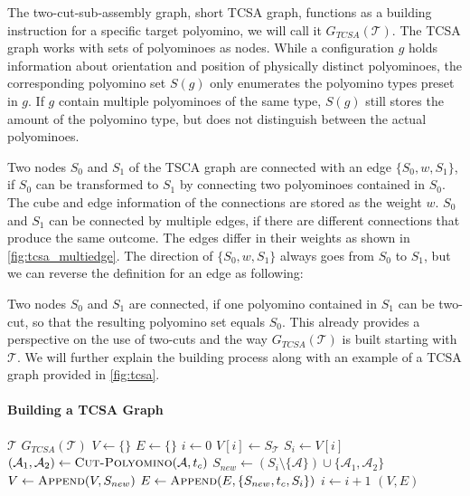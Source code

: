 The two-cut-sub-assembly graph, short TCSA graph, functions as a building instruction for a specific target polyomino, we will call it $G_{\textit{TCSA}}(\mathcal{T})$.
The TCSA graph works with sets of polyominoes as nodes.
While a configuration $g$ holds information about orientation and position of physically distinct polyominoes, the corresponding polyomino set $S(g)$ only enumerates the polyomino types preset in $g$.
If $g$ contain multiple polyominoes of the same type, $S(g)$ still stores the amount of the polyomino type, but does not distinguish between the actual polyominoes.

Two nodes $S_0$ and $S_1$ of the TSCA graph are connected with an edge $\{S_0,w,S_1\}$, if $S_0$ can be transformed to $S_1$ by connecting two polyominoes contained in $S_0$.
The cube and edge information of the connections are stored as the weight $w$.
$S_0$ and $S_1$ can be connected by multiple edges, if there are different connections that produce the same outcome.
The edges differ in their weights as shown in \autoref{fig:tcsa_multiedge}.
The direction of $\{S_0,w,S_1\}$ always goes from $S_0$ to $S_1$, but we can reverse the definition for an edge as following:

Two nodes $S_0$ and $S_1$ are connected, if one polyomino contained in $S_1$ can be two-cut, so that the resulting polyomino set equals $S_0$.
This already provides a perspective on the use of two-cuts and the way $G_{\textit{TCSA}}(\mathcal{T})$ is built starting with $\mathcal{T}$.
We will further explain the building process along with an example of a TCSA graph provided in \autoref{fig:tcsa}.


\paragraph{Building a TCSA Graph}

\begin{algorithm}
	\caption{$\text{\scshape Build-TCSA-Graph}$}
	\label{algo:build_tcsa}
	\begin{algorithmic}[1]
		\REQUIRE $\mathcal{T}$ 
		\ENSURE $G_{\textit{TCSA}}(\mathcal{T})$  
		\STATE $V \gets \{\}$
		\STATE $E \gets \{\}$
		\STATE $i \gets 0$
		\STATE $V[i] \gets S_\mathcal{T}$ 
			\STATE $S_i \gets V[i]$
					\STATE $(\mathcal{A}_1, \mathcal{A}_2) \gets \text{\scshape Cut-Polyomino}(\mathcal{A}, t_c)$
					\STATE $S_{new} \gets \left( S_i \setminus \{\mathcal{A}\} \right) \cup \{\mathcal{A}_1, \mathcal{A}_2\}$ 
						\STATE $V \gets \text{\scshape Append}(V, S_{new})$
					\ENDIF
					\STATE $E \gets \text{\scshape Append}(E, \{S_{new}, t_c, S_i\})$
				\ENDFOR
			\ENDFOR
			\STATE $i \gets i+1$
		\ENDWHILE
		\RETURN $(V,E)$
	\end{algorithmic}
\end{algorithm}

